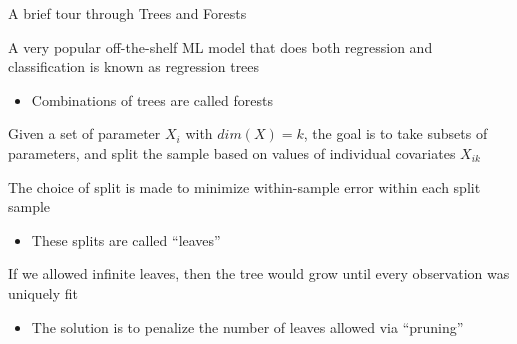 \documentclass[notes,11pt, aspectratio=169]{beamer}
\newenvironment{wideitemize}{\itemize\addtolength{\itemsep}{10pt}}{\enditemize}
\begin{document}
\begin{frame}{A brief tour through Trees and Forests}
  \begin{wideitemize}
  \item A very popular off-the-shelf ML model that does both regression and classification is known as regression trees
    \begin{itemize}
    \item  Combinations of trees are called forests
    \end{itemize}
  \item Given a set of parameter $X_{i}$ with $dim(X) = k$, the goal
    is to take subsets of parameters, and split the sample based on values of individual covariates $X_{ik}$
  \item The choice of split is made to minimize within-sample error within each split sample
    \begin{itemize}
    \item These splits are called ``leaves''

    \end{itemize}
  \item If we allowed infinite leaves, then the tree would grow until every observation was uniquely fit
    \begin{itemize}
    \item The solution is to penalize the number of leaves allowed via ``pruning''
    \end{itemize}
  \end{wideitemize}
\end{frame}
\end{document}
